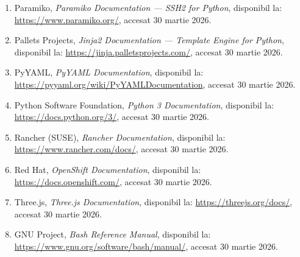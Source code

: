 \documentclass[12pt,a4paper]{report}
\begin{document}
\begin{enumerate}
\item Paramiko, \textit{Paramiko Documentation — SSH2 for Python}, disponibil la: \url{https://www.paramiko.org/}, accesat 30 martie 2026.

\item Pallets Projects, \textit{Jinja2 Documentation — Template Engine for Python}, disponibil la: \url{https://jinja.palletsprojects.com/}, accesat 30 martie 2026.

\item PyYAML, \textit{PyYAML Documentation}, disponibil la: \url{https://pyyaml.org/wiki/PyYAMLDocumentation}, accesat 30 martie 2026.

\item Python Software Foundation, \textit{Python 3 Documentation}, disponibil la: \url{https://docs.python.org/3/}, accesat 30 martie 2026.

\item Rancher (SUSE), \textit{Rancher Documentation}, disponibil la: \url{https://www.rancher.com/docs/}, accesat 30 martie 2026.

\item Red Hat, \textit{OpenShift Documentation}, disponibil la: \url{https://docs.openshift.com/}, accesat 30 martie 2026.

\item Three.js, \textit{Three.js Documentation}, disponibil la: \url{https://threejs.org/docs/}, accesat 30 martie 2026.

\item GNU Project, \textit{Bash Reference Manual}, disponibil la: \url{https://www.gnu.org/software/bash/manual/}, accesat 30 martie 2026.

\end{enumerate}
\end{document}
